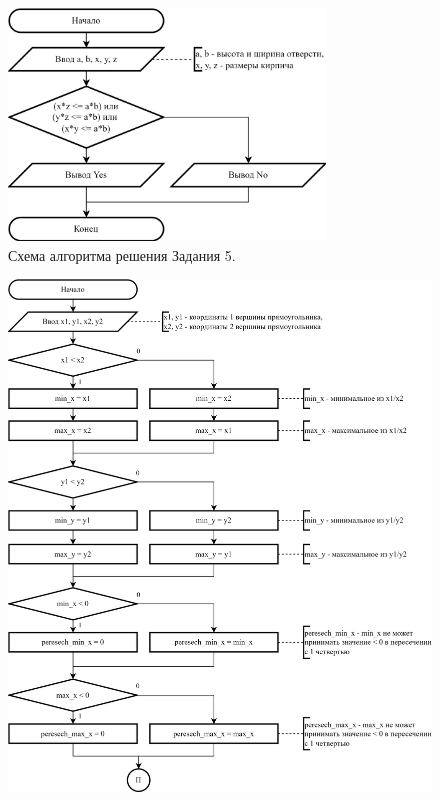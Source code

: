 \documentclass[oneside,a4paper,14pt]{extarticle}
\begin{document}
\begin{figure}
	\centering
	\includegraphics[width=0.75\textwidth]{img/5-scheme.png} %
	\caption{Схема алгоритма решения Задания 5.} %
\end{figure}
\begin{figure}
	\centering
	\includegraphics[height=0.9\textheight]{img/6-scheme-p1.png} %
\end{figure}
\end{document}
